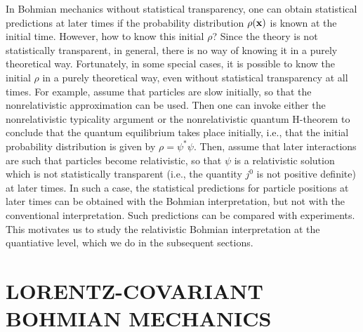 \documentclass[12pt]{article}
\begin{document}
In Bohmian mechanics without statistical transparency, 
one can obtain statistical predictions at later times if 
the probability distribution $\rho({\bf x})$ is known at the initial 
time. However, how to know this initial $\rho$? Since the theory is not
statistically transparent, in general, there 
is no way of knowing it in a purely theoretical way. 
Fortunately, in some special cases, 
it is possible to know the initial $\rho$ in a purely theoretical way, 
even without statistical 
transparency at all times. For example,
assume that particles 
are slow initially, so that the nonrelativistic approximation
can be used. Then one can invoke either the nonrelativistic 
typicality argument \cite{durr1,durr2} or the nonrelativistic 
quantum H-theorem \cite{val} to conclude that 
the quantum equilibrium takes place initially, i.e., 
that the initial 
probability distribution is given by $\rho=\psi^*\psi$. 
%
%
Then, assume that later interactions are such that particles 
become relativistic, so that $\psi$ is a relativistic solution  
which is not statistically transparent
(i.e., the quantity $j^0$ is not positive definite) 
at later times. In such a case, 
the statistical predictions for particle positions at later times 
can be obtained with the Bohmian interpretation, but not with 
the conventional interpretation.
Such predictions can be compared with experiments.
This motivates us to study the relativistic Bohmian interpretation 
at the quantiative level, which we do in the subsequent sections.

\section{LORENTZ-COVARIANT BOHMIAN MECHANICS}
\label{secBM}
\end{document}
